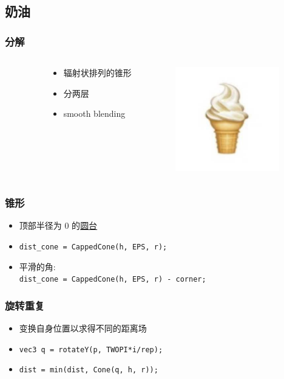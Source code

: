 \documentclass[aspectratio=169]{ctexbeamer} %
\begin{document}
\subsection{奶油}
\begin{frame}
    \frametitle{分解} %
    \begin{columns}
    \begin{column}{.1\textwidth}\end{column}
        \begin{column}{.4\textwidth}
            \begin{itemize}
                \item 辐射状排列的锥形
                \item 分两层
                \item smooth blending %
            \end{itemize}
        \end{column}
        \begin{column}{.5\textwidth}
            \includegraphics[width=128pt]{images/pre/emoji.pdf}
        \end{column}
    \end{columns}
\end{frame}
\begin{frame}
    \frametitle{锥形}
    \begin{itemize}
        \item 顶部半径为 0 的\underline{圆台}
        \item \texttt{dist\_cone = CappedCone(h, EPS, r);}
        \item 平滑的角: \\
        \texttt{dist\_cone = CappedCone(h, EPS, r) - corner;}
    \end{itemize}
\end{frame}
\begin{frame}
    \frametitle{旋转重复}
    \begin{itemize}
        \item 变换自身位置以求得不同的距离场
        \item \texttt{vec3 q = rotateY(p, TWOPI*i/rep);}
        \item \texttt{dist = min(dist, Cone(q, h, r));}
    \end{itemize}
\end{frame}
\end{document}
